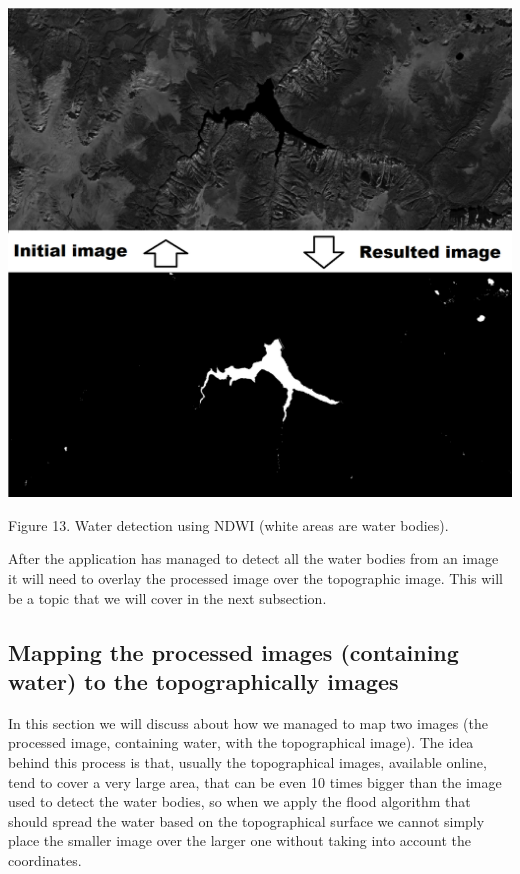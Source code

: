 \documentclass[12pt, a4paper]{report}
\begin{document}
\bigskip
\includegraphics[scale=0.4, left]{NDWI-prediction.png}
\begin{center}
Figure 13. Water detection using NDWI (white areas are water bodies).
\end{center}
\par 

After the application has managed to detect all the water bodies from an image it will need to overlay the processed image over the topographic image. This will be a topic that we will cover in the next subsection.

\subsection{Mapping the processed images (containing water) to the topographically images}

\quad
In this section we will discuss about how we managed to map two images (the processed image, containing water, with the topographical image). The idea behind this process is that, usually the topographical images, available online, tend to cover a very large area, that can be even 10 times bigger than the image used to detect the water bodies, so when we apply the flood algorithm that should spread the water based on the topographical surface we cannot simply place the smaller image over the larger one without taking into account the coordinates. 
\par 
\end{document}
